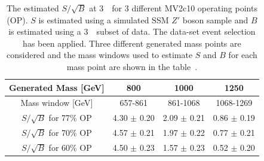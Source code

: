 \vspace{-0.4em}
{\renewcommand{\arraystretch}{1.2}
\begin{table}[ht]
\begin{center}
\begin{tabular}{|c||c|c|c|}
  \hline
  Generated Mass [GeV]            &   800       &  1000       & 1250\\
  \hline
  Mass window [GeV]              &   657-861    &  861-1068   &  1068-1269   \\
  \hline
  $S/\sqrt{B}$ for 77\% OP    &  4.30 $\pm$ 0.20 & 2.09 $\pm$ 0.21 & 0.86 $\pm$ 0.19  \\
  $S/\sqrt{B}$ for 70\% OP    &  4.57 $\pm$ 0.21 & 1.97 $\pm$ 0.22 & 0.77 $\pm$ 0.21  \\
  $S/\sqrt{B}$ for 60\% OP    &  4.50 $\pm$ 0.23 & 1.57 $\pm$ 0.23 & 0.52 $\pm$ 0.20  \\
  \hline
\end{tabular}
\caption[The estimated $S/\sqrt{B}$ at 3~\ifb~for 3 different MV2c10 operating points (OP) for the \lm{} data-set analysis.]
        {The estimated $S/\sqrt{B}$ at 3~\ifb~for 3 different MV2c10 operating points (OP).
          $S$ is estimated using a simulated SSM $Z'$ boson sample and $B$ is estimated using a 3~\ifb~subset of data.
          The \lm{} data-set event selection has been applied.
          Three different generated mass points are considered and the mass windows used
          to estimate $S$ and $B$ for each mass point are shown in the table~\cite{dibjet-full_int}.}
\vspace{-2em}
\label{tab:evt-btag_lm}
\end{center}
\end{table}
}
